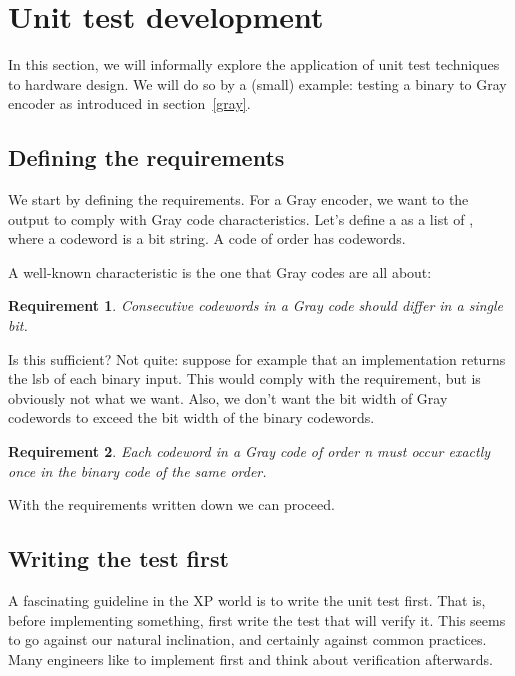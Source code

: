 \section{Unit test development}

In this section, we will informally explore the application of unit
test techniques to hardware design. We will do so by a (small)
example: testing a binary to Gray encoder as introduced in
section~\ref{gray}. 

\subsection{Defining the requirements}

We start by defining the requirements. For a Gray encoder, we want to
the output to comply with Gray code characteristics. Let's define a
 as a list of , where a codeword is a bit
string. A code of order  has  codewords.

A well-known characteristic is the one that Gray codes are all about:

\newtheorem{reqGray}{Requirement}
\begin{reqGray} 
Consecutive codewords in a Gray code should differ in a single bit.
\end{reqGray}

Is this sufficient? Not quite: suppose for example that an
implementation returns the lsb of each binary input. This would comply
with the requirement, but is obviously not what we want. Also, we don't
want the bit width of Gray codewords to exceed the bit width of the
binary codewords.

\begin{reqGray} 
Each codeword in a Gray code of order n must occur exactly once in the
binary code of the same order.
\end{reqGray}

With the requirements written down we can proceed.

\subsection{Writing the test first}

A fascinating guideline in the XP world is to write the unit test
first. That is, before implementing something, first write the test
that will verify it. This seems to go against our natural inclination,
and certainly against common practices. Many engineers like to
implement first and think about verification afterwards.

